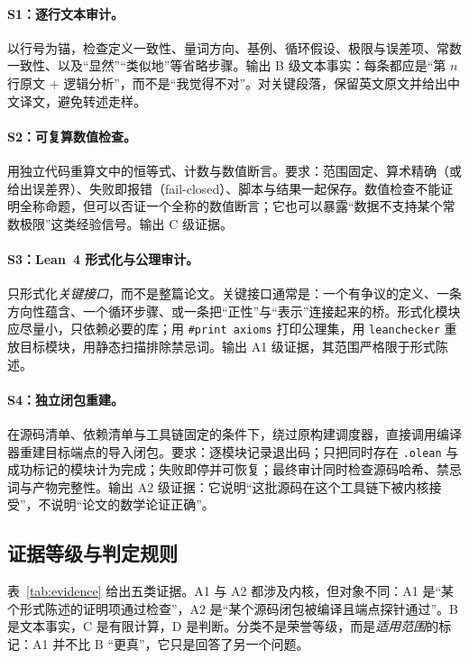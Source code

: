 \documentclass[11pt,a4paper]{ctexart}
\theoremstyle{plain}
\theoremstyle{definition}
\begin{document}
\paragraph{S1：逐行文本审计。}
以行号为锚，检查定义一致性、量词方向、基例、循环假设、极限与误差项、常数一致性、以及“显然”“类似地”等省略步骤。输出 B 级文本事实：每条都应是“第 $n$ 行原文 + 逻辑分析”，而不是“我觉得不对”。对关键段落，保留英文原文并给出中文译文，避免转述走样。

\paragraph{S2：可复算数值检查。}
用独立代码重算文中的恒等式、计数与数值断言。要求：范围固定、算术精确（或给出误差界）、失败即报错（fail-closed）、脚本与结果一起保存。数值检查不能证明全称命题，但可以否证一个全称的数值断言；它也可以暴露“数据不支持某个常数极限”这类经验信号。输出 C 级证据。

\paragraph{S3：Lean~4 形式化与公理审计。}
只形式化\emph{关键接口}，而不是整篇论文。关键接口通常是：一个有争议的定义、一条方向性蕴含、一个循环步骤、或一条把“正性”与“表示”连接起来的桥。形式化模块应尽量小，只依赖必要的库；用 \texttt{\#print axioms} 打印公理集，用 \texttt{leanchecker} 重放目标模块，用静态扫描排除禁忌词。输出 A1 级证据，其范围严格限于形式陈述。

\paragraph{S4：独立闭包重建。}
在源码清单、依赖清单与工具链固定的条件下，绕过原构建调度器，直接调用编译器重建目标端点的导入闭包。要求：逐模块记录退出码；只把同时存在 \texttt{.olean} 与成功标记的模块计为完成；失败即停并可恢复；最终审计同时检查源码哈希、禁忌词与产物完整性。输出 A2 级证据：它说明“这批源码在这个工具链下被内核接受”，不说明“论文的数学论证正确”。

\subsection{证据等级与判定规则}
\label{sec:evidence}

表~\ref{tab:evidence} 给出五类证据。A1 与 A2 都涉及内核，但对象不同：A1 是“某个形式陈述的证明项通过检查”，A2 是“某个源码闭包被编译且端点探针通过”。B 是文本事实，C 是有限计算，D 是判断。分类不是荣誉等级，而是\emph{适用范围}的标记：A1 并不比 B “更真”，它只是回答了另一个问题。
\end{document}
